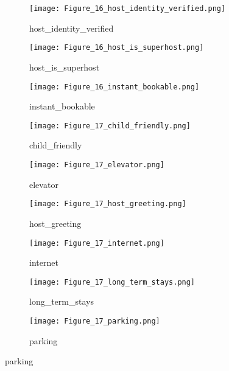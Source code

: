 \begin{figure}[ht!]
    \begin{center}

    \begin{subfigure}[b]{0.3\textwidth}
        \centering
        \caption{host\_identity\_verified}
        \texttt{[image: Figure\_16\_host\_identity\_verified.png]}
    \end{subfigure}
    \hfill
    \begin{subfigure}[b]{0.3\textwidth}
        \centering
        \caption{host\_is\_superhost}
        \texttt{[image: Figure\_16\_host\_is\_superhost.png]}
    \end{subfigure}
    \hfill
    \begin{subfigure}[b]{0.3\textwidth}
        \centering
        \caption{instant\_bookable}
        \texttt{[image: Figure\_16\_instant\_bookable.png]}
    \end{subfigure}
    \hfill
    \begin{subfigure}[b]{0.3\textwidth}
        \centering
        \caption{child\_friendly}
        \texttt{[image: Figure\_17\_child\_friendly.png]}
    \end{subfigure}
    \hfill
    \begin{subfigure}[b]{0.3\textwidth}
        \centering
        \caption{elevator}
        \texttt{[image: Figure\_17\_elevator.png]}
    \end{subfigure}
    \hfill
    \begin{subfigure}[b]{0.3\textwidth}
        \centering
        \caption{host\_greeting}
        \texttt{[image: Figure\_17\_host\_greeting.png]}
    \end{subfigure}
    \hfill
    \begin{subfigure}[b]{0.3\textwidth}
        \centering
        \caption{internet}
        \texttt{[image: Figure\_17\_internet.png]}
    \end{subfigure}
    \hfill
    \begin{subfigure}[b]{0.3\textwidth}
        \centering
        \caption{long\_term\_stays}
        \texttt{[image: Figure\_17\_long\_term\_stays.png]}
    \end{subfigure}
    \begin{subfigure}[b]{0.3\textwidth}
        \centering
        \caption{parking}
        \texttt{[image: Figure\_17\_parking.png]}

\end{subfigure}
\end{center}
\end{figure}
